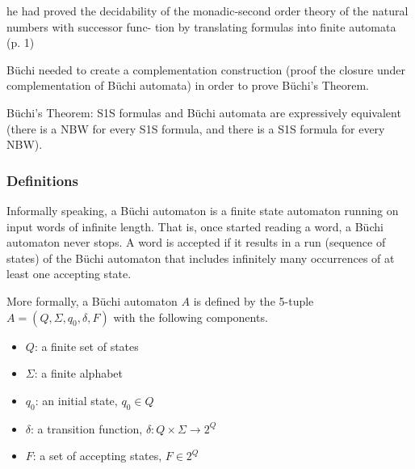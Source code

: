 \documentclass[a4paper]{report}
\begin{document}
he had proved the decidability of the monadic-second order theory of the natural numbers with successor func- tion by translating formulas into finite automata~\cite{vardi2007automata} (p. 1)


Büchi needed to create a complementation construction (proof the closure under complementation of Büchi automata) in order to prove Büchi's Theorem.

Büchi's Theorem: S1S formulas and Büchi automata are expressively equivalent (there is a NBW for every S1S formula, and there is a S1S formula for every NBW).

\subsubsection{Definitions}
Informally speaking, a Büchi automaton is a finite state automaton running on input words of infinite length. That is, once started reading a word, a Büchi automaton never stops. A word is accepted if it results in a run (sequence of states) of the Büchi automaton that includes infinitely many occurrences of at least one accepting state.

More formally, a Büchi automaton $A$ is defined by the 5-tuple $A = (Q, \Sigma, q_0, \delta, F)$ with the following components.
\begin{itemize}
\item $Q$: a finite set of states
\item $\Sigma$: a finite alphabet
\item $q_0$: an initial state, $q_0 \in Q$
\item $\delta$: a transition function, $\delta: Q \times \Sigma \rightarrow 2^Q$ %
\item $F$: a set of accepting states, $F \in 2^Q$
\end{itemize}
\end{document}

